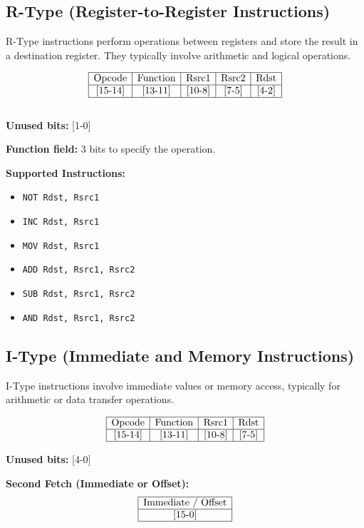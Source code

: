 \documentclass{report}
\begin{document}
\subsection*{R-Type (Register-to-Register Instructions)}
R-Type instructions perform operations between registers and store the result in a destination register. They typically involve arithmetic and logical operations.

\[
\begin{array}{|c|c|c|c|c|}
\hline
\text{Opcode} & \text{Function} & \text{Rsrc1} & \text{Rsrc2} & \text{Rdst} \\
\hline
\text{[15-14]} & \text{[13-11]} & \text{[10-8]} & \text{[7-5]} & \text{[4-2]} \\
\hline
\end{array}
\] \\

\textbf{Unused bits:} [1-0]

\textbf{Function field:} 3 bits to specify the operation.

\textbf{Supported Instructions:}
\begin{itemize}
    \item \texttt{NOT Rdst, Rsrc1}
    \item \texttt{INC Rdst, Rsrc1}
    \item \texttt{MOV Rdst, Rsrc1}
    \item \texttt{ADD Rdst, Rsrc1, Rsrc2}
    \item \texttt{SUB Rdst, Rsrc1, Rsrc2}
    \item \texttt{AND Rdst, Rsrc1, Rsrc2}
\end{itemize}

\subsection*{I-Type (Immediate and Memory Instructions)}
I-Type instructions involve immediate values or memory access, typically for arithmetic or data transfer operations.

\[
\begin{array}{|c|c|c|c|}
\hline
\text{Opcode} & \text{Function} & \text{Rsrc1} & \text{Rdst} \\
\hline
\text{[15-14]} & \text{[13-11]} & \text{[10-8]} & \text{[7-5]} \\
\hline
\end{array}
\]

\textbf{Unused bits:} [4-0]

\textbf{Second Fetch (Immediate or Offset):}
\[
\begin{array}{|c|}
\hline
\text{Immediate / Offset} \\
\hline
\text{[15-0]} \\
\hline
\end{array}
\]
\end{document}
